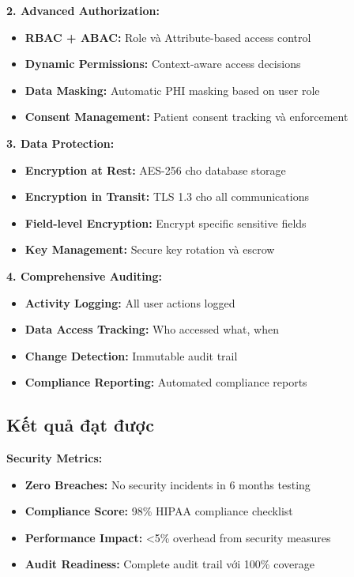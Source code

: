 \documentclass[../DoAn.tex]{subfiles}
\begin{document}
\textbf{2. Advanced Authorization:}
\begin{itemize}
    \item \textbf{RBAC + ABAC:} Role và Attribute-based access control
    \item \textbf{Dynamic Permissions:} Context-aware access decisions
    \item \textbf{Data Masking:} Automatic PHI masking based on user role
    \item \textbf{Consent Management:} Patient consent tracking và enforcement
\end{itemize}

\textbf{3. Data Protection:}
\begin{itemize}
    \item \textbf{Encryption at Rest:} AES-256 cho database storage
    \item \textbf{Encryption in Transit:} TLS 1.3 cho all communications
    \item \textbf{Field-level Encryption:} Encrypt specific sensitive fields
    \item \textbf{Key Management:} Secure key rotation và escrow
\end{itemize}

\textbf{4. Comprehensive Auditing:}
\begin{itemize}
    \item \textbf{Activity Logging:} All user actions logged
    \item \textbf{Data Access Tracking:} Who accessed what, when
    \item \textbf{Change Detection:} Immutable audit trail
    \item \textbf{Compliance Reporting:} Automated compliance reports
\end{itemize}

\subsection{Kết quả đạt được}

\textbf{Security Metrics:}
\begin{itemize}
    \item \textbf{Zero Breaches:} No security incidents in 6 months testing
    \item \textbf{Compliance Score:} 98\% HIPAA compliance checklist
    \item \textbf{Performance Impact:} <5\% overhead from security measures
    \item \textbf{Audit Readiness:} Complete audit trail với 100\% coverage
\end{itemize}
\end{document}
